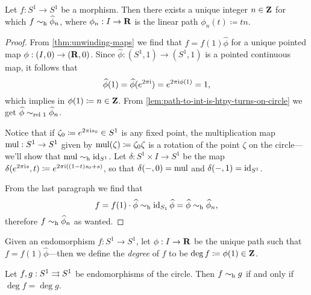 \begin{proposition}
    \label{prop:circle-morphism-is-winding}
    Let \(f: S^1 \to S^1\) be a morphism. Then there exists a unique integer
    \(n \in \mathbf{Z}\) for which \(f \sim_{\text{h}} \widehat \phi_n\), where \(\phi_n: I \to \mathbf{R}\)
    is the linear path \(\phi_n(t) \coloneq t n\).
\end{proposition}

\begin{proof}
    From \cref{thm:unwinding-maps} we find that \(f = f(1) \widehat \phi\) for a
    unique pointed map \(\phi: (I, 0) \to (\mathbf{R}, 0)\). Since
    \(\widehat \phi: (S^1, 1) \to (S^1, 1)\) is a pointed continuous map, it follows
    that
    \[
        \widehat\phi(1) = \widehat \phi(e^{2 \pi \text{i}}) = e^{2 \pi \text{i} \phi(1)} = 1,
    \]
    which implies in \(\phi(1) \coloneq n \in \mathbf{Z}\). From
    \cref{lem:path-to-int-is-htpy-turns-on-circle} we get
    \(\widehat \phi \sim_{\text{rel }{1}} \widehat \phi_n\).

    Notice that if \(\zeta_0 \coloneq e^{2\pi \text{i} s_0} \in S^1\) is any fixed
    point, the multiplication map \(\operatorname{mul}: S^1 \to S^1\) given by
    \(\operatorname{mul}(\zeta) \coloneq \zeta_0 \zeta\) is a rotation of the point \(\zeta\) on
    the circle---we'll show that \(\operatorname{mul} \sim_{\text{h}} \operatorname{id}_{S^1}\). Let
    \(\delta: S^1 \times I \to S^1\) be the map
    \(\delta(e^{2 \pi \text{i} s}, t) \coloneq e^{2 \pi \text{i} ((1 - t) s_0 + s)}\), so
    that \(\delta(-, 0) = \operatorname{mul}\) and \(\delta(-, 1) = \operatorname{id}_{S^1}\).

    From the last paragraph we find that
    \[
        f = f(1) \cdot \widehat \phi
        \sim_{\text{h}} \operatorname{id}_{S_1} \widehat \phi
        = \widehat \phi
        \sim_{\text{h}} \widehat \phi_n,
    \]
    therefore \(f \sim_{\text{h}} \widehat \phi_n\) as wanted.
\end{proof}

\begin{definition}[Degree]
    \label{def:degree-S1-map}
    Given an endomorphism \(f: S^1 \to S^1\), let \(\phi: I \to \mathbf{R}\) be the unique
    path such that \(f = f(1) \widehat \phi\)---then we define the \emph{degree} of
    \(f\) to be \(\deg f \coloneq \phi(1) \in \mathbf{Z}\).
\end{definition}

\begin{lemma}
    \label{lem:homotopic-S1-maps-have-equal-degree}
    Let \(f, g: S^1 \rightrightarrows S^1\) be endomorphisms of the circle. Then \(f \sim_{\text{h}} g\)
    if and only if \(\deg f = \deg g\).
\end{lemma}

